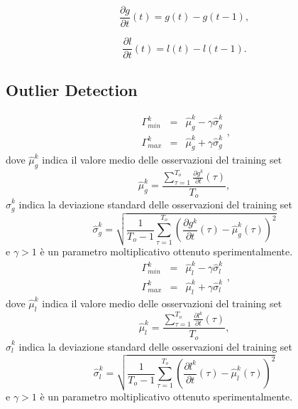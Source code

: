 \documentclass{llncs}
\begin{document}
\begin{equation}
\label{eq:gradientDetr}
\frac{\partial g}{\partial t}(t) = g(t) - g(t-1),
\end{equation}


\begin{equation}
\label{eq:lumaDetr}
\frac{\partial l}{\partial t}(t) = l(t) - l(t-1).
\end{equation}


\subsection{Outlier Detection}\label{subsec:MonitoringScheme}



\begin{equation}
\label{eq:soglieGradiente}
\begin{array}{lcl}
\Gamma_{min}^k & = & \hat{\mu}_g^k -\gamma \hat{\sigma}_g^k\\
\Gamma_{max}^k & = & \hat{\mu}_g^k + \gamma \hat{\sigma}_g^k
\end{array},
\end{equation}
dove $\hat{\mu}_g^k$ indica il valore medio delle osservazioni del training set
\begin{equation}
\hat{\mu}_g^k = \frac{\sum_{\tau = 1}^{T_{o}} \frac{\partial g^k}{\partial t}(\tau)}{T_{o}}, \nonumber
\end{equation}
$\hat{\sigma}_g^k$ indica la deviazione standard delle osservazioni del training set
\begin{equation}
\hat{\sigma}_g^k  = \sqrt{\frac{1}{T_{o}-1}\sum_{\tau=1}^{T_{o}}\left(\frac{\partial g^k}{\partial t}(\tau) - \hat{\mu}_g^k(\tau)\right)^2} \nonumber
\end{equation}
e $\gamma>1$ \`e un parametro moltiplicativo ottenuto sperimentalmente.\\

\begin{equation}
\label{eq:soglieLuma}
\begin{array}{rcl}
\Gamma_{min}^k & = & \hat{\mu}_l^k -\gamma \hat{\sigma}_l^k\\
\Gamma_{max}^k & = & \hat{\mu}_l^k + \gamma \hat{\sigma}_l^k
\end{array},
\end{equation}
dove $\hat{\mu}_l^k$ indica il valore medio delle osservazioni del training set
\begin{equation}
\hat{\mu}_l^k = \frac{\sum_{\tau = 1}^{T_{o}} \frac{\partial l^k}{\partial t}(\tau)}{T_{o}}, \nonumber
\end{equation}
$\hat{\sigma}_l^k$ indica la deviazione standard delle osservazioni del training set
\begin{equation}
\hat{\sigma}_l^k  = \sqrt{\frac{1}{T_{o}-1}\sum_{\tau=1}^{T_{o}}\left(\frac{\partial l^k}{\partial t}(\tau) - \hat{\mu}_l^k(\tau)\right)^2} \nonumber
\end{equation}
e $\gamma>1$ \`e un parametro moltiplicativo ottenuto sperimentalmente.\\
\end{document}
